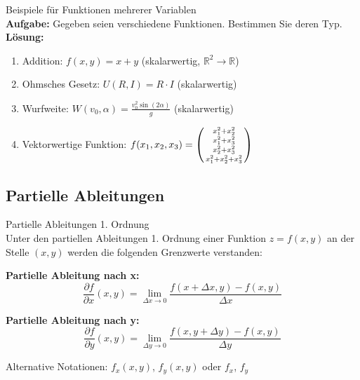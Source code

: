 \begin{example2}{Beispiele für Funktionen mehrerer Variablen}\\
\textbf{Aufgabe:} Gegeben seien verschiedene Funktionen. Bestimmen Sie deren Typ.
\tcblower
\textbf{Lösung:}
\begin{enumerate}
    \item Addition: $f(x,y) = x + y$ (skalarwertig, $\mathbb{R}^2 \rightarrow \mathbb{R}$)
    \item Ohmsches Gesetz: $U(R,I) = R \cdot I$ (skalarwertig)
    \item Wurfweite: $W(v_0, \alpha) = \frac{v_0^2 \sin(2\alpha)}{g}$ (skalarwertig)
    \item Vektorwertige Funktion: $f(x_1, x_2, x_3) = \begin{psmallmatrix} x_1^2 + x_2^2 \\ x_1^2 + x_3^2 \\ x_2^2 + x_3^2 \\ x_1^2 + x_2^2 + x_3^2 \end{psmallmatrix}$
\end{enumerate}
\end{example2}

\subsection{Partielle Ableitungen}

\begin{definition}{Partielle Ableitungen 1. Ordnung}\\
Unter den partiellen Ableitungen 1. Ordnung einer Funktion $z = f(x,y)$ an der Stelle $(x,y)$ werden die folgenden Grenzwerte verstanden:

\textbf{Partielle Ableitung nach x:}
$$\frac{\partial f}{\partial x}(x,y) = \lim_{\Delta x \rightarrow 0} \frac{f(x + \Delta x, y) - f(x,y)}{\Delta x}$$

\textbf{Partielle Ableitung nach y:}
$$\frac{\partial f}{\partial y}(x,y) = \lim_{\Delta y \rightarrow 0} \frac{f(x, y + \Delta y) - f(x,y)}{\Delta y}$$

Alternative Notationen: $f_x(x,y)$, $f_y(x,y)$ oder $f_x$, $f_y$
\end{definition}

